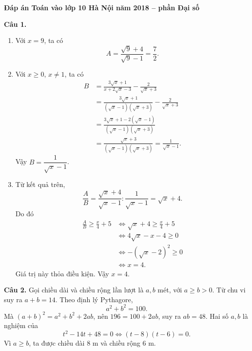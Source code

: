 \documentclass[12pt,a4paper]{article}
\begin{document}
\begin{center}
{\Large\bfseries Đáp án Toán vào lớp 10 Hà Nội năm 2018 -- phần Đại số}
\end{center}

\textbf{Câu 1.}
\begin{enumerate}[label=\arabic*)]
  \item Với $x=9$, ta có
  \[
  A=\frac{\sqrt{9}+4}{\sqrt{9}-1}=\frac{7}{2}.
  \]
  \item Với $x\ge0$, $x\ne1$, ta có
  \begin{align*}
  B&=\frac{3\sqrt{x}+1}{x+2\sqrt{x}-3}-\frac{2}{\sqrt{x}+3}\\
   &=\frac{3\sqrt{x}+1}{(\sqrt{x}-1)(\sqrt{x}+3)}-\frac{2}{\sqrt{x}+3}\\
   &=\frac{3\sqrt{x}+1-2(\sqrt{x}-1)}{(\sqrt{x}-1)(\sqrt{x}+3)}\\
   &=\frac{\sqrt{x}+3}{(\sqrt{x}-1)(\sqrt{x}+3)}
    =\frac{1}{\sqrt{x}-1}.
  \end{align*}
  Vậy $B=\dfrac{1}{\sqrt{x}-1}$.
  \item Từ kết quả trên,
  \[
  \frac{A}{B}=\frac{\sqrt{x}+4}{\sqrt{x}-1}:\frac{1}{\sqrt{x}-1}=\sqrt{x}+4.
  \]
  Do đó
  \begin{align*}
  \frac{A}{B}\ge\frac{x}{4}+5
  &\Longleftrightarrow \sqrt{x}+4\ge\frac{x}{4}+5\\
  &\Longleftrightarrow 4\sqrt{x}-x-4\ge0\\
  &\Longleftrightarrow -(\sqrt{x}-2)^2\ge0\\
  &\Longleftrightarrow x=4.
  \end{align*}
  Giá trị này thỏa điều kiện. Vậy $x=4$.
\end{enumerate}

\textbf{Câu 2.} Gọi chiều dài và chiều rộng lần lượt là $a,b$ mét, với $a\ge b>0$. Từ chu vi suy ra $a+b=14$. Theo định lý Pythagore,
\[
a^2+b^2=100.
\]
Mà $(a+b)^2=a^2+b^2+2ab$, nên $196=100+2ab$, suy ra $ab=48$. Hai số $a,b$ là nghiệm của
\[
t^2-14t+48=0\Longleftrightarrow (t-8)(t-6)=0.
\]
Vì $a\ge b$, ta được chiều dài $8$ m và chiều rộng $6$ m.
\end{document}
